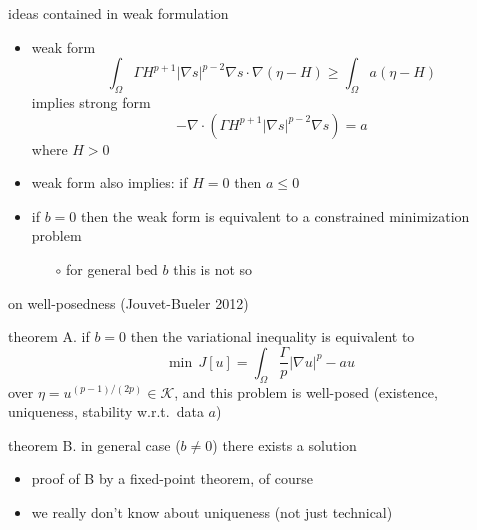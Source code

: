 \documentclass[hide notes,intlimits]{beamer}
\newcommand{\Kcal}{\mathcal{K}}
\newcommand{\Div}{\nabla\cdot}
\newcommand{\grad}{\nabla}
\begin{document}
\begin{frame}{ideas contained in weak formulation} 
\begin{itemize}
\item weak form
  $$\int_{\Omega}  \Gamma H^{p+1} |\grad s|^{p-2} \grad s \cdot \grad(\eta - H)  
\ge \int_{\Omega} a (\eta - H)$$
implies strong form
  $$-\Div \left(\Gamma H^{p+1} |\nabla s|^{p-2} \nabla s  \right) =  a$$
where $H>0$
\item weak form also implies: if $H=0$ then $a \le 0$
\item if $b=0$ then the weak form is equivalent to a constrained minimization problem
  \begin{itemize}
  \item[$\circ$] for general bed $b$ this is not so
  \end{itemize}
\end{itemize}
\end{frame}


\begin{frame}{on well-posedness (Jouvet-Bueler 2012)} 
\begin{block}{theorem A.}
if $b=0$ then the variational inequality is equivalent to
  $$\min \, J[u] = \int_{\Omega} \frac{\Gamma}{p} |\grad u|^p - a u$$
over $\eta = u^{(p-1)/(2p)} \in \Kcal$, and this problem is well-posed (existence, uniqueness, stability w.r.t.~data $a$)
\end{block}
\begin{block}{theorem B.}
in general case ($b\ne 0$) there exists a solution
\end{block}
\begin{itemize}
\item proof of B by a fixed-point theorem, of course
\item we really don't know about uniqueness (not just technical)
\end{itemize}
\end{frame}
\end{document}
